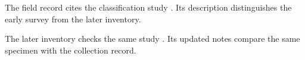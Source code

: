 \documentclass{article}
\begin{document}
The field record cites the classification study \autocite[1]{smith2020}. Its description distinguishes the early survey from the later inventory.

\vspace{18.14cm}
The later inventory checks the same study \autocite[2]{smith2020}. Its updated notes compare the same specimen with the collection record.
\printbibliography
\end{document}

